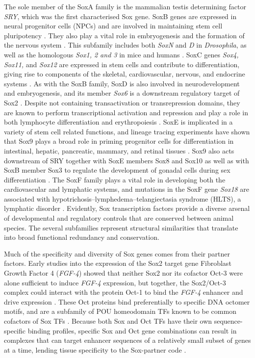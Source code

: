 \documentclass[withindex,glossary]{cam-thesis}
\begin{document}
The sole member of the SoxA family is the mammalian testis determining
factor \emph{SRY}, which was the first characterised Sox gene. SoxB
genes are expressed in neural progenitor cells (\gls{NPCs}) and are involved
in maintaining stem cell pluripotency .
They also play a vital role in embryogenesis and the formation of the
nervous system . This subfamily includes both
\emph{SoxN} and \emph{D} in \emph{Drosophila}, as well as the homologous
\emph{Sox1, 2 and 3} in mice and humans . SoxC
genes \emph{Sox4, Sox11,} and \emph{Sox12} are expressed in stem cells
and contribute to differentiation, giving rise to components of the
skeletal, cardiovascular, nervous, and endocrine systems . As with the SoxB family, SoxD is also involved in
neurodevelopment and embryogenesis, and its member \emph{Sox6} is a
downstream regulatory target of Sox2 . Despite not
containing transactivation or transrepression domains, they are known to
perform transcriptional activation and repression and play a role in
both lymphocyte differentiation and erythropoiesis . SoxE is implicated in a variety of stem cell related
functions, and lineage tracing experiments have shown that Sox9 plays a
broad role in priming progenitor cells for differentiation in
intestinal, hepatic, pancreatic, mammary, and retinal tissues . Sox9 also acts downstream
of SRY together with SoxE members Sox8 and Sox10 as well as with SoxB
member Sox3 to regulate the development of gonadal cells during sex
differentiation . The SoxF family plays
a vital role in developing both the cardiovascular and lymphatic
systems, and mutations in the SoxF gene \emph{Sox18} are associated with
hypotrichosis--lymphedema--telangiectasia syndrome (\gls{HLTS}), a lymphatic
disorder . Evidently, Sox
transcription factors provide a diverse arsenal of developmental and
regulatory controls that are conserved between animal species. The
several subfamilies represent structural similarities that translate
into broad functional redundancy and conservation.

Much of the specificity and diversity of Sox genes comes from their
partner factors. Early studies into the expression of the Sox2 target
gene Fibroblast Growth Factor 4 (\emph{FGF-4}) showed that neither Sox2
nor its cofactor Oct-3 were alone sufficient to induce \emph{FGF-4}
expression, but together, the Sox2/Oct-3 complex could interact with the
protein Oct-1 to bind the \emph{FGF-4} enhancer and drive expression
. These Oct proteins bind preferentially to specific
DNA octomer motifs, and are a subfamily of POU homeodomain TFs known to
be common cofactors of Sox TFs . Because both Sox and Oct
TFs have their own sequence-specific binding profiles, specific Sox and
Oct gene combinations can result in complexes that can target enhancer
sequences of a relatively small subset of genes at a time, lending
tissue specificity to the Sox-partner code .
\end{document}
